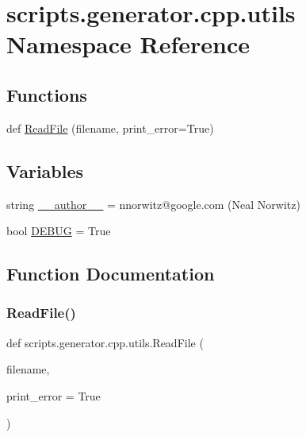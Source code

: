\hypertarget{namespacescripts_1_1generator_1_1cpp_1_1utils}{}\section{scripts.\+generator.\+cpp.\+utils Namespace Reference}
\label{namespacescripts_1_1generator_1_1cpp_1_1utils}
\subsection*{Functions}
\begin{DoxyCompactItemize}
\item 
def \mbox{\hyperlink{namespacescripts_1_1generator_1_1cpp_1_1utils_a49971a3ac031487a5e151f2e74be871a}{Read\+File}} (filename, print\+\_\+error=True)
\end{DoxyCompactItemize}
\subsection*{Variables}
\begin{DoxyCompactItemize}
\item 
string \mbox{\hyperlink{namespacescripts_1_1generator_1_1cpp_1_1utils_a89132687936f756356e554b1b05fa03c}{\+\_\+\+\_\+author\+\_\+\+\_\+}} = \textquotesingle{}nnorwitz@google.\+com (Neal Norwitz)\textquotesingle{}
\item 
bool \mbox{\hyperlink{namespacescripts_1_1generator_1_1cpp_1_1utils_a91edd7d6c42148905da0644123cdd721}{D\+E\+B\+UG}} = True
\end{DoxyCompactItemize}


\subsection{Function Documentation}
\mbox{\label{namespacescripts_1_1generator_1_1cpp_1_1utils_a49971a3ac031487a5e151f2e74be871a}} 
\subsubsection{\texorpdfstring{ReadFile()}{ReadFile()}}
{\footnotesize\ttfamily def scripts.\+generator.\+cpp.\+utils.\+Read\+File (\begin{DoxyParamCaption}\item[{}]{filename,  }\item[{}]{print\+\_\+error = {\ttfamily True} }\end{DoxyParamCaption})}

